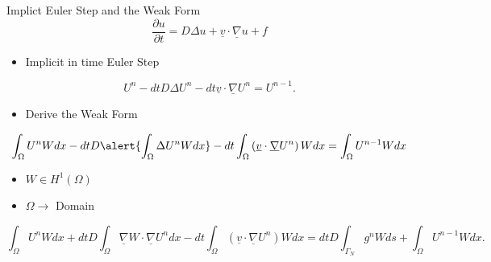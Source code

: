 \documentclass[10pt]{beamer}
\begin{document}
\begin{frame}{Implict Euler Step and the Weak Form}  \label{EulerandWeak}
\begin{equation}
\frac{\partial u}{\partial t}= D\Delta u + \underline{v} \cdot \underline{\nabla}u+f
\end{equation}
\begin{itemize}
\item Implicit in time Euler Step
\end{itemize}
\footnotesize
\begin{equation}
U^{n}-dtD\Delta U^{n}-dt\underline{v}\cdot \underline{\nabla}U^{n}=U^{n-1}.
\end{equation}
\normalsize
\begin{itemize}
\item Derive the Weak Form
\end{itemize}
\footnotesize
\begin{equation}
\int_{\Omega}U^{n}W dx -dtD\alert{ \int_{\Omega}\Delta U^{n}W dx}-dt\int_{\Omega}\left(\underline{v}\cdot \underline{\nabla}U^{n}\right)W dx=\int_{\Omega} U^{n-1}W dx
\end{equation}

\begin{itemize}
\item $W \in H^{1}\left({\Omega}\right)$
\item $\Omega \rightarrow$ Domain
\end{itemize}

\begin{equation}
\int_{\Omega}U^{n}W dx +dtD\int_{\Omega}\underline{\nabla}W \cdot \underline{\nabla} U^{n} dx-dt\int_{\Omega}\left(\underline{v}\cdot \underline{\nabla}U^{n}\right)W dx=dtD\int_{\Gamma_{N}}g^{n}W ds+ \int_{\Omega} U^{n-1}W dx.
\end{equation}
\normalsize

\hyperlink{Questions}{}
\end{frame}
\end{document}
